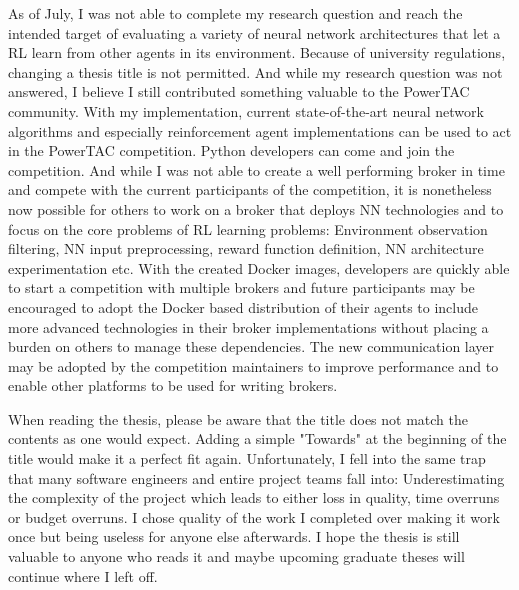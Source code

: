 As of July, I was not able to complete my research question and reach the intended target of evaluating a variety of
neural network architectures that let a RL learn from other agents in its environment. Because of university
regulations, changing a thesis title is not permitted. And while my research question was not answered, I believe I
still contributed something valuable to the PowerTAC community. With my implementation, current state-of-the-art neural
network algorithms and especially reinforcement agent implementations can be used to act in the PowerTAC competition.
Python developers can come and join the competition.
And while I was not able to create a well performing broker in time and compete with the current participants of the
competition, it is nonetheless now possible for others to work on a broker that deploys \ac{NN} technologies and to focus on the core problems of RL learning
problems: Environment observation filtering, NN input preprocessing, reward function definition, NN architecture
experimentation etc. With the created Docker images, developers are quickly able to start a competition with multiple
brokers and future participants may be encouraged to adopt the Docker based distribution of their agents to include more
advanced technologies in their broker implementations without placing a burden on others to manage these dependencies.
The new communication layer may be adopted by the competition maintainers to improve performance and to enable other
platforms to be used for writing brokers.   

When reading the thesis, please be aware that the title does not match the contents as one would expect. Adding a simple
"Towards" at the beginning of the title would make it a perfect fit again. Unfortunately, I fell into the same trap that
many software engineers and entire project teams fall into: Underestimating the complexity of the project which leads to
either loss in quality, time overruns or budget overruns. I chose quality of the work I completed over making it work
once but being useless for anyone else afterwards. I hope the thesis is still valuable to anyone who reads it and maybe
upcoming graduate theses will continue where I left off. 

